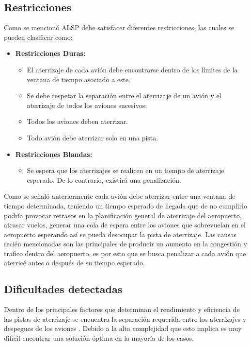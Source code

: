 \documentclass[letter, 10pt]{article}
\begin{document}
\subsection{Restricciones}
Como se mencionó ALSP debe satisfacer diferentes restricciones, las cuales se pueden clasificar como:
\begin{itemize}
    \item \textbf{Restricciones Duras:} 
    \begin{itemize}
        \item El aterrizaje de cada avión debe encontrarse dentro de los límites de la ventana de tiempo asociado a este.
        \item Se debe respetar la separación entre el aterrizaje de un avión y el aterrizaje de todos los aviones sucesivos.
        \item Todos los aviones deben aterrizar.
        \item Todo avión debe aterrizar solo en una pista.
    \end{itemize}
    \item \textbf{Restricciones Blandas:}
    \begin{itemize}
        \item Se espera que los aterrizajes se realicen en un tiempo de aterrizaje esperado. De lo contrario, existirá una  penalización. 
    \end{itemize}
\end{itemize}
Como se señaló anteriormente cada avión debe aterrizar entre una ventana de tiempo determinada, teniendo un tiempo esperado de llegada que de no cumplirlo podría provocar retrasos en la planificación general de aterrizaje del aeropuerto, atrasar vuelos, generar una cola de espera entre los aviones que sobrevuelan en el aeropuerto esperando así se pueda desocupar la pista de aterrizaje. Las causas recién mencionadas son las principales de producir un aumento en la congestión y trafico dentro del aeropuerto, es por esto que se busca penalizar a cada avión que aterricé antes o después de su tiempo esperado.\\


\subsection{Dificultades detectadas}

Dentro de los principales factores que determinan el rendimiento y eficiencia de las pistas de aterrizaje se encuentra la separación requerida entre los aterrizajes y despegues de los aviones \cite{article1}. Debido a la alta complejidad que esto implica es muy difícil encontrar una solución óptima en la mayoría de los casos.
\end{document}
